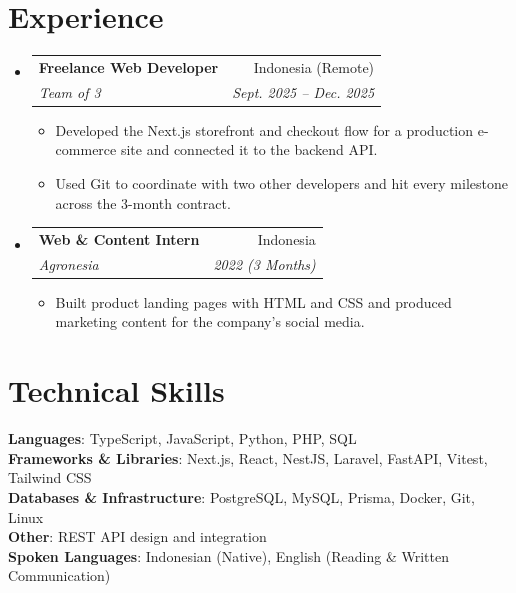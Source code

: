 \documentclass[letterpaper,11pt]{article}
\makeatletter
\newcommand{\resumeItem}[1]{
  \item\small{
    {#1 \vspace{-2pt}}
  }
}
\newcommand{\resumeSubheading}[4]{
  \vspace{-2pt}\item
    \begin{tabular*}{0.97\textwidth}[t]{l@{\extracolsep{\fill}}r}
      \textbf{#1} & #2 \\
      \textit{\small#3} & \textit{\small #4} \\
    \end{tabular*}\vspace{-5pt}
}
\newcommand{\resumeSubHeadingListStart}{\begin{itemize}[leftmargin=0.15in, label={}]}
\newcommand{\resumeSubHeadingListEnd}{\end{itemize}}
\newcommand{\resumeItemListStart}{\begin{itemize}[itemsep=0pt, topsep=0pt, parsep=2pt]}
\newcommand{\resumeItemListEnd}{\end{itemize}\vspace{1pt}}
\makeatother
\begin{document}
\section{Experience}
  \resumeSubHeadingListStart

    \resumeSubheading
      {Freelance Web Developer}{Indonesia (Remote)}
      {Team of 3}{Sept. 2025 -- Dec. 2025}
      \resumeItemListStart
        \resumeItem{Developed the Next.js storefront and checkout flow for a production e-commerce site and connected it to the backend API.}
        \resumeItem{Used Git to coordinate with two other developers and hit every milestone across the 3-month contract.}
      \resumeItemListEnd

    \resumeSubheading
      {Web \& Content Intern}{Indonesia}
      {Agronesia}{2022 (3 Months)}
      \resumeItemListStart
        \resumeItem{Built product landing pages with HTML and CSS and produced marketing content for the company's social media.}
      \resumeItemListEnd

  \resumeSubHeadingListEnd

\section{Technical Skills}
 \begin{itemize}[leftmargin=0.15in, label={}]
    \small{\item{
     \textbf{Languages}{: TypeScript, JavaScript, Python, PHP, SQL} \\
     \textbf{Frameworks \& Libraries}{: Next.js, React, NestJS, Laravel, FastAPI, Vitest, Tailwind CSS} \\
     \textbf{Databases \& Infrastructure}{: PostgreSQL, MySQL, Prisma, Docker, Git, Linux} \\
     \textbf{Other}{: REST API design and integration} \\
     \textbf{Spoken Languages}{: Indonesian (Native), English (Reading \& Written Communication)}
    }}
  \end{itemize}
\end{document}
